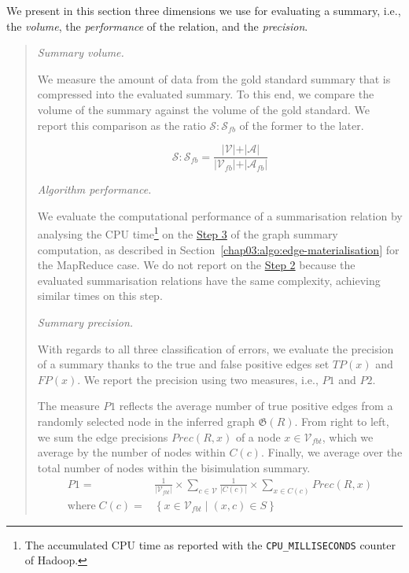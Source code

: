 We present in this section three dimensions we use for evaluating a summary, i.e., the \emph{volume}, the \emph{performance} of the relation, and the \emph{precision}.

\begin{quotation}
\item[\emph{Summary volume.}]

We measure the amount of data from the gold standard summary that is compressed into the evaluated summary. To this end, we compare the volume of the summary against the volume of the gold standard. We report this comparison as the ratio  $\mathcal{S}:\mathcal{S}_{fb}$ of the former to the later.

$$
\mathcal{S}:\mathcal{S}_{fb} = \frac{\vert \mathcal{V} \vert + \vert \mathcal{A} \vert}{\vert \mathcal{V}_{fb} \vert + \vert \mathcal{A}_{fb} \vert}
$$

\item[\emph{Algorithm performance.}]

We evaluate the computational performance of a summarisation relation by analysing the CPU time\footnote{The accumulated CPU time as reported with the \texttt{CPU\_MILLISECONDS} counter of Hadoop.} on the \hyperref[step-he]{Step 3} of the graph summary computation, as described in Section~\ref{chap03:algo:edge-materialisation} for the MapReduce case. We do not report on the \hyperref[step-hn]{Step 2} because the evaluated summarisation relations have the same complexity, achieving similar times on this step.

\item[\emph{Summary precision.}]

With regards to all three classification of errors, we evaluate the precision of a summary thanks to the true and false positive edges set $TP(x)$ and $FP(x)$.
We report the precision using two measures, i.e., $P1$ and $P2$.

The measure $P1$ reflects the average number of true positive edges from a randomly selected node in the inferred graph $\mathfrak{G}(R)$. From right to left, we sum the edge precisions $Prec(R, x)$ of a node $x\in \mathcal{V}_{fbt}$, which we average by the number of nodes within $C(c)$. Finally, we average over the total number of nodes within the bisimulation summary.
$$
\begin{aligned}
P1 = & \frac{1}{\vert \mathcal{V}_{fbt} \vert} \times \sum_{c \in \mathcal{V}}{\frac{1}{\vert C(c) \vert} \times \sum_{x \in C(c)}{Prec(R, x)}} \\
\text{where}\; C(c) = & \left\lbrace x \in \mathcal{V}_{fbt} \mid (x, c) \in S \right\rbrace
\end{aligned}
$$


\end{quotation}

